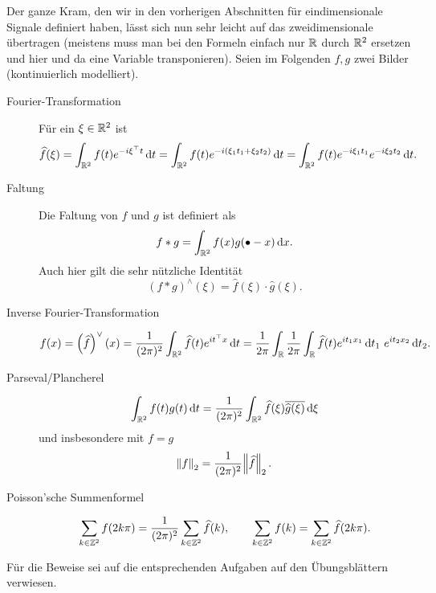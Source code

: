 \begin{remark}
Der ganze Kram, den wir in den vorherigen Abschnitten für eindimensionale Signale definiert haben,
lässt sich nun sehr leicht auf das zweidimensionale übertragen (meistens muss man bei den Formeln
einfach nur $ \mathbb{R} $ durch $ \mathbb{R}^{2} $ ersetzen und hier und da eine Variable transponieren). Seien im 
Folgenden $ f, g $ zwei Bilder (kontinuierlich modelliert).
\begin{description}
\item [Fourier-Transformation] 
  Für ein $ \xi \in \mathbb{R}^{2} $ ist
  \[
      \widehat{f}(\xi) 
    = \int_{\R^{2}} f(t) e^{-i \xi^{\top} t} \dif t
    = \int_{\R^{2}} f(t) e^{-i (\xi_{1}t_{1} + \xi_{2}t_{2})} \dif t
    = \int_{\R^{2}} f(t) e^{-i\xi_{1}t_{1}} e^{-i\xi_{2}t_{2}} \dif t.
  \]
\item [Faltung]
  Die Faltung von $ f $ und $ g $ ist definiert als
  \[
    f * g = \int_{\R^{2}} f(x) g(\bullet - x) \dif x.
  \]
  Auch hier gilt die sehr nützliche Identität
  \[
    (f * g)^{\wedge}(\xi) = \widehat{f}(\xi) \cdot \widehat{g}(\xi).
  \]
\item [Inverse Fourier-Transformation]
  \[
      f(x) 
    = \left( \widehat{f} \right)^{\vee}(x)
    = \frac{1}{(2\pi)^{2}} \int_{\R^{2}} \widehat{f}(t) e^{it^{\top}x} \dif t
    = \frac{1}{2\pi} \int_{\R} \frac{1}{2\pi} \int_{\R} 
        \widehat{f}(t) e^{it_{1}x_{1}} \dif t_{1} \ e^{it_{2}x_{2}} \dif t_{2}.
  \]
\item [Parseval/Plancherel]
\[
    \int_{\R^{2}} f(t)g(t) \dif t
  = \frac{1}{(2\pi)^{2}} \int_{\R^{2}} \widehat{f}(\xi) \overline{\widehat{g}(\xi)} \dif \xi
\]
und insbesondere mit $ f = g $
\[
  \norm{f}_{2} = \frac{1}{(2\pi)^{2}} \norm{\widehat{f}}_{2}.
\]
\item [Poisson'sche Summenformel]
\[
    \sum_{k \in \mathbb{Z}^{2}} f(2k\pi)
  = \frac{1}{(2\pi)^{2}} \sum_{k \in \mathbb{Z}^{2}} \widehat{f}(k), \qquad
    \sum_{k \in \mathbb{Z}^{2}} f(k)
  = \sum_{k \in \mathbb{Z}^{2}} \widehat{f}(2k\pi).
\]
\end{description}
Für die Beweise sei auf die entsprechenden Aufgaben auf den Übungsblättern verwiesen.
\end{remark}

